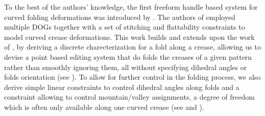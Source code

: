 To the best of the authors' knowledge, the first freeform handle based system for curved folding deformations was introduced by \cite{rabi2018shape}.  The authors of \cite{rabi2018shape} employed multiple DOGs together with a set of stitching and flattability constraints to model curved crease deformations. This work builds and extends upon the work of \cite{rabi2018shape}, by deriving a discrete charecterization for a fold along a crease, allowing us to devise a point based editing system that do folds the creases of a given pattern rather than smoothly ignoring them, all without specifying dihedral angles or folds orientation (see ). To allow for further control in the folding process, we also derive simple linear constraints to control dihedral angles along folds and a constraint allowing to control mountain/valley assignments, a degree of freedom which is often only available along one curved crease (see  and ).